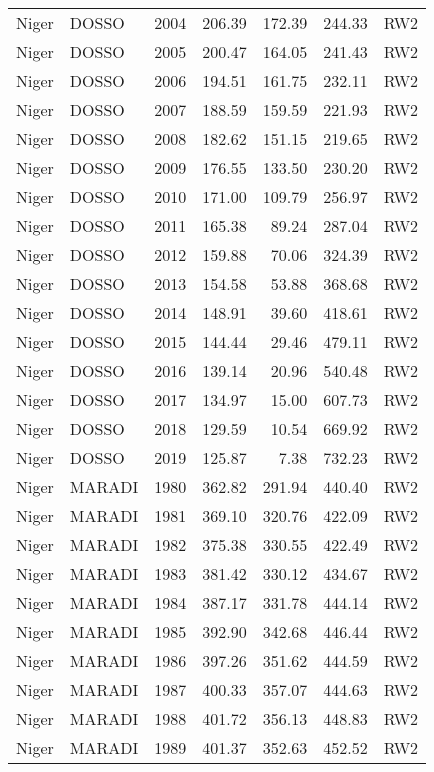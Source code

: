 \begin{longtable}{lllrrrl}
  Niger & DOSSO & 2004 & 206.39 & 172.39 & 244.33 & RW2 \\ 
  Niger & DOSSO & 2005 & 200.47 & 164.05 & 241.43 & RW2 \\ 
  Niger & DOSSO & 2006 & 194.51 & 161.75 & 232.11 & RW2 \\ 
  Niger & DOSSO & 2007 & 188.59 & 159.59 & 221.93 & RW2 \\ 
  Niger & DOSSO & 2008 & 182.62 & 151.15 & 219.65 & RW2 \\ 
  Niger & DOSSO & 2009 & 176.55 & 133.50 & 230.20 & RW2 \\ 
  Niger & DOSSO & 2010 & 171.00 & 109.79 & 256.97 & RW2 \\ 
  Niger & DOSSO & 2011 & 165.38 & 89.24 & 287.04 & RW2 \\ 
  Niger & DOSSO & 2012 & 159.88 & 70.06 & 324.39 & RW2 \\ 
  Niger & DOSSO & 2013 & 154.58 & 53.88 & 368.68 & RW2 \\ 
  Niger & DOSSO & 2014 & 148.91 & 39.60 & 418.61 & RW2 \\ 
  Niger & DOSSO & 2015 & 144.44 & 29.46 & 479.11 & RW2 \\ 
  Niger & DOSSO & 2016 & 139.14 & 20.96 & 540.48 & RW2 \\ 
  Niger & DOSSO & 2017 & 134.97 & 15.00 & 607.73 & RW2 \\ 
  Niger & DOSSO & 2018 & 129.59 & 10.54 & 669.92 & RW2 \\ 
  Niger & DOSSO & 2019 & 125.87 & 7.38 & 732.23 & RW2 \\ 
  Niger & MARADI & 1980 & 362.82 & 291.94 & 440.40 & RW2 \\ 
  Niger & MARADI & 1981 & 369.10 & 320.76 & 422.09 & RW2 \\ 
  Niger & MARADI & 1982 & 375.38 & 330.55 & 422.49 & RW2 \\ 
  Niger & MARADI & 1983 & 381.42 & 330.12 & 434.67 & RW2 \\ 
  Niger & MARADI & 1984 & 387.17 & 331.78 & 444.14 & RW2 \\ 
  Niger & MARADI & 1985 & 392.90 & 342.68 & 446.44 & RW2 \\ 
  Niger & MARADI & 1986 & 397.26 & 351.62 & 444.59 & RW2 \\ 
  Niger & MARADI & 1987 & 400.33 & 357.07 & 444.63 & RW2 \\ 
  Niger & MARADI & 1988 & 401.72 & 356.13 & 448.83 & RW2 \\ 
  Niger & MARADI & 1989 & 401.37 & 352.63 & 452.52 & RW2 \\ 

\end{longtable}
